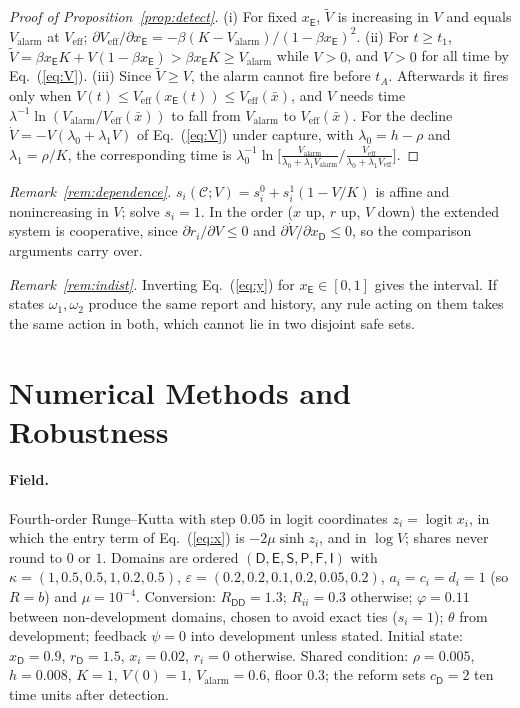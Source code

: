 \documentclass[letterpaper]{article} %
\theoremstyle{definition}
\newcommand{\dD}{\mathsf{D}}
\newcommand{\dE}{\mathsf{E}}
\newcommand{\dS}{\mathsf{S}}
\newcommand{\dP}{\mathsf{P}}
\newcommand{\dF}{\mathsf{F}}
\newcommand{\dI}{\mathsf{I}}
\newcommand{\cC}{\mathcal{C}}
\newcommand{\Valarm}{V_{\mathrm{alarm}}}
\begin{document}
\begin{proof}[Proof of Proposition~\ref{prop:detect}]
(i) For fixed $x_\dE$, $\tilde V$ is increasing in $V$ and equals $\Valarm$ at $V_{\mathrm{eff}}$; $\partial V_{\mathrm{eff}}/\partial x_\dE=-\beta(K-\Valarm)/(1-\beta x_\dE)^2$. (ii) For $t\ge t_1$, $\tilde V=\beta x_\dE K+V(1-\beta x_\dE)>\beta x_\dE K\ge\Valarm$ while $V>0$, and $V>0$ for all time by Eq.~(\ref{eq:V}). (iii) Since $\tilde V\ge V$, the alarm cannot fire before $t_A$. Afterwards it fires only when $V(t)\le V_{\mathrm{eff}}(x_\dE(t))\le V_{\mathrm{eff}}(\bar x)$, and $V$ needs time $\lambda^{-1}\ln(\Valarm/V_{\mathrm{eff}}(\bar x))$ to fall from $\Valarm$ to $V_{\mathrm{eff}}(\bar x)$. For the decline $\dot V=-V(\lambda_0+\lambda_1V)$ of Eq.~(\ref{eq:V}) under capture, with $\lambda_0=h-\rho$ and $\lambda_1=\rho/K$, the corresponding time is $\lambda_0^{-1}\ln\big[\tfrac{\Valarm}{\lambda_0+\lambda_1\Valarm}\big/\tfrac{V_{\mathrm{eff}}}{\lambda_0+\lambda_1V_{\mathrm{eff}}}\big]$.
\end{proof}

\noindent\emph{Remark~\ref{rem:dependence}.} $s_i(\cC;V)=s^0_i+s^1_i(1-V/K)$ is affine and nonincreasing in $V$; solve $s_i=1$. In the order ($x$ up, $r$ up, $V$ down) the extended system is cooperative, since $\partial\dot r_i/\partial V\le0$ and $\partial\dot V/\partial x_\dD\le0$, so the comparison arguments carry over.

\noindent\emph{Remark~\ref{rem:indist}.} Inverting Eq.~(\ref{eq:y}) for $x_\dE\in[0,1]$ gives the interval. If states $\omega_1,\omega_2$ produce the same report and history, any rule acting on them takes the same action in both, which cannot lie in two disjoint safe sets.

\section{Numerical Methods and Robustness}\label{app:numerics}

\paragraph{Field.} Fourth-order Runge--Kutta with step $0.05$ in logit coordinates $z_i=\operatorname{logit}x_i$, in which the entry term of Eq.~(\ref{eq:x}) is $-2\mu\sinh z_i$, and in $\log V$; shares never round to $0$ or $1$. Domains are ordered $(\dD,\dE,\dS,\dP,\dF,\dI)$ with $\kappa=(1,0.5,0.5,1,0.2,0.5)$, $\varepsilon=(0.2,0.2,0.1,0.2,0.05,0.2)$, $a_i=c_i=d_i=1$ (so $R=b$) and $\mu=10^{-4}$. Conversion: $R_{\dD\dD}=1.3$; $R_{ii}=0.3$ otherwise; $\varphi=0.11$ between non-development domains, chosen to avoid exact ties ($s_i=1$); $\theta$ from development; feedback $\psi=0$ into development unless stated. Initial state: $x_\dD=0.9$, $r_\dD=1.5$, $x_i=0.02$, $r_i=0$ otherwise. Shared condition: $\rho=0.005$, $h=0.008$, $K=1$, $V(0)=1$, $\Valarm=0.6$, floor $0.3$; the reform sets $c_\dD=2$ ten time units after detection.
\end{document}
